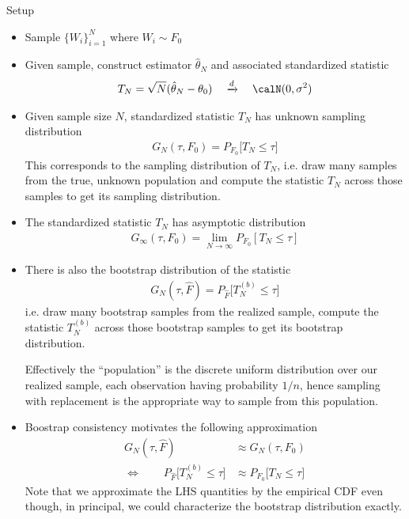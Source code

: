 \documentclass[12pt]{article}
\theoremstyle{plain}
\theoremstyle{definition}
\theoremstyle{remark}
\newcommand{\ra}{\rightarrow}
\newcommand{\dto}{\xrightarrow{d}}
\begin{document}
Setup
\begin{itemize}
  \item Sample $\{W_i\}_{i=1}^N$ where $W_i\sim F_0$
  \item Given sample, construct estimator $\hat{\theta}_N$ and
    associated standardized statistic
    \begin{align*}
      T_N
      =
      \sqrt{N}(\hat{\theta}_N-\theta_0)
      \quad
      \dto
      \quad
      \calN(0,\sigma^2)
    \end{align*}

  \item Given sample size $N$, standardized statistic $T_N$ has unknown
    sampling distribution
    \begin{align*}
      G_N(\tau,F_0)
      =
      P_{F_0}\big[
        T_N \leq \tau
      \big]
    \end{align*}
    This corresponds to the sampling distribution of $T_N$, i.e. draw
    many samples from the true, unknown population and compute the
    statistic $T_N$ across those samples to get its sampling
    distribution.

  \item
    The standardized statistic $T_N$ has asymptotic distribution
    \begin{align*}
      G_\infty(\tau,F_0)
      =
      \lim_{N\ra\infty}
      P_{F_0}[T_N\leq \tau]
    \end{align*}


  \item There is also the bootstrap distribution of the statistic
    \begin{align*}
      G_N(\tau,\hat{F})
      =
      P_{\hat{F}}\big[
        T_N^{(b)} \leq \tau
      \big]
    \end{align*}
    i.e. draw many bootstrap samples from the realized sample, compute
    the statistic $T_N^{(b)}$ across those bootstrap samples to get its
    bootstrap distribution.

    Effectively the ``population'' is the discrete uniform distribution
    over our realized sample, each observation having probability $1/n$,
    hence sampling with replacement is the appropriate way to sample
    from this population.


  \item
    Boostrap consistency motivates the following approximation
    \begin{align*}
      G_N(\tau,\hat{F})
      &\approx
      G_N(\tau,F_0)
      \\
      \iff\qquad
      P_{\hat{F}}\big[
        T_N^{(b)} \leq \tau
      \big]
      &\approx
      P_{F_0}\big[
        T_N \leq \tau
      \big]
    \end{align*}
    Note that we approximate the LHS quantities by the empirical CDF
    even though, in principal, we could characterize the bootstrap
    distribution exactly.
\end{itemize}
\end{document}
